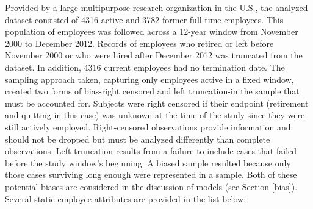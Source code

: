 Provided by a large multipurpose research organization in the U.S., the analyzed dataset consisted of 4316 active and 3782 former full-time employees. This population of employees was followed across a 12-year window from November 2000 to December 2012. Records of employees who retired or left before November 2000 or who were hired after December 2012 was truncated from the dataset. In addition, 4316 current employees had no termination date.  The sampling approach taken, capturing only employees active in a fixed window, created two forms of bias-right censored and left truncation-in the sample that must be accounted for. Subjects were right censored if their endpoint (retirement and quitting in this case) was unknown at the time of the study since they were still actively employed. Right-censored observations provide information and should not be dropped but must be analyzed differently than complete observations.  Left truncation results from a failure to include cases that failed before the study window's beginning.  A biased sample resulted because only those cases surviving long enough were represented in a sample. Both of these potential biases are considered in the discussion of models (see Section \ref{bias}).
Several static employee attributes are provided in the list below:

